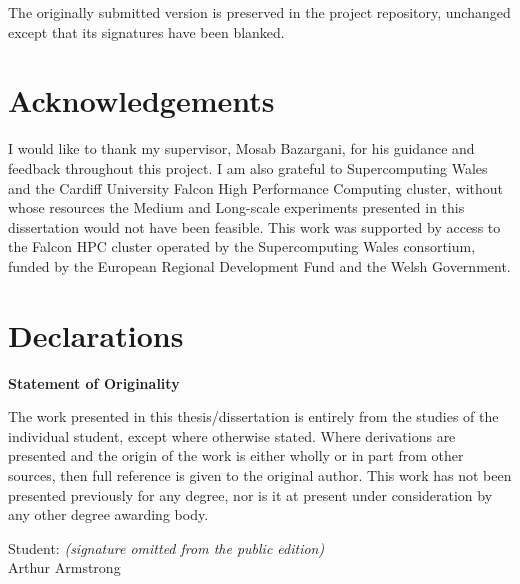 \documentclass[12pt, a4paper, oneside]{report}
\begin{document}
The originally submitted version is preserved in the project
repository, unchanged except that its signatures have been blanked.

\newpage

\chapter*{Acknowledgements}

I would like to thank my supervisor, Mosab Bazargani, for his
guidance and feedback throughout this project. I am also grateful to
Supercomputing Wales and the Cardiff University Falcon High
Performance Computing cluster, without whose resources the Medium and
Long-scale experiments presented in this dissertation would not have
been feasible. This work was supported by access to the Falcon HPC
cluster operated by the Supercomputing Wales consortium, funded by
the European Regional Development Fund and the Welsh Government.

\newpage

\chapter*{Declarations}

\begin{mdframed}
\textbf{Statement of Originality}

\medskip
The work presented in this thesis/dissertation is entirely from the
studies of the individual student, except where otherwise stated.
Where derivations are presented and the origin of the work is either
wholly or in part from other sources, then full reference is given to
the original author. This work has not been presented previously for
any degree, nor is it at present under consideration by any other
degree awarding body.

Student:
\vspace{0.5cm}
\hspace{2cm}
{\small\itshape (signature omitted from the public edition)}\\[0.1cm]
\vspace{0.4cm}
Arthur Armstrong
\end{mdframed}

\vspace{1cm}
\end{document}

